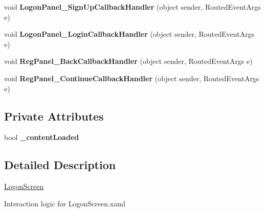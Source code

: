\begin{DoxyCompactItemize}
\mbox{\label{class_wpf_handler_1_1_u_i_1_1_controls_1_1_logon_1_1_logon_screen_aa1e319e525c55df19dcfae4c0c7be28b}} 
void {\bfseries Logon\+Panel\+\_\+\+Sign\+Up\+Callback\+Handler} (object sender, Routed\+Event\+Args e)
\item 
\mbox{\label{class_wpf_handler_1_1_u_i_1_1_controls_1_1_logon_1_1_logon_screen_a13d71de70976c6c1e9f36fb40ec27c65}} 
void {\bfseries Logon\+Panel\+\_\+\+Login\+Callback\+Handler} (object sender, Routed\+Event\+Args e)
\item 
\mbox{\label{class_wpf_handler_1_1_u_i_1_1_controls_1_1_logon_1_1_logon_screen_ae87f001176943ff985fcf2fe6f64a791}} 
void {\bfseries Reg\+Panel\+\_\+\+Back\+Callback\+Handler} (object sender, Routed\+Event\+Args e)
\item 
\mbox{\label{class_wpf_handler_1_1_u_i_1_1_controls_1_1_logon_1_1_logon_screen_ac838f760444a09b103c141dd23f32c03}} 
void {\bfseries Reg\+Panel\+\_\+\+Continue\+Callback\+Handler} (object sender, Routed\+Event\+Args e)
\end{DoxyCompactItemize}
\subsection*{Private Attributes}
\begin{DoxyCompactItemize}
\item 
\mbox{\label{class_wpf_handler_1_1_u_i_1_1_controls_1_1_logon_1_1_logon_screen_a507b43de13994d560610ccfda99d1b21}} 
bool {\bfseries \+\_\+content\+Loaded}
\end{DoxyCompactItemize}


\subsection{Detailed Description}
\mbox{\hyperlink{class_wpf_handler_1_1_u_i_1_1_controls_1_1_logon_1_1_logon_screen}{Logon\+Screen}} 

Interaction logic for Logon\+Screen.\+xaml 

